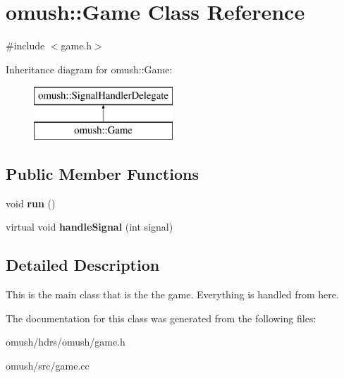 \hypertarget{classomush_1_1_game}{\section{omush\-:\-:Game Class Reference}
\label{classomush_1_1_game}
}


{\ttfamily \#include $<$game.\-h$>$}

Inheritance diagram for omush\-:\-:Game\-:\begin{figure}[H]
\begin{center}
\leavevmode
\includegraphics[height=2.000000cm]{classomush_1_1_game}
\end{center}
\end{figure}
\subsection*{Public Member Functions}
\begin{DoxyCompactItemize}
\item 
\hypertarget{classomush_1_1_game_aae6eb03bcbc479ce68eaf6a1b449665a}{void {\bfseries run} ()}\label{classomush_1_1_game_aae6eb03bcbc479ce68eaf6a1b449665a}

\item 
\hypertarget{classomush_1_1_game_a90582895228ea196287a36d35d21f3ba}{virtual void {\bfseries handle\-Signal} (int signal)}\label{classomush_1_1_game_a90582895228ea196287a36d35d21f3ba}

\end{DoxyCompactItemize}


\subsection{Detailed Description}
This is the main class that is the the game. Everything is handled from here. 

The documentation for this class was generated from the following files\-:\begin{DoxyCompactItemize}
\item 
omush/hdrs/omush/game.\-h\item 
omush/src/game.\-cc\end{DoxyCompactItemize}
